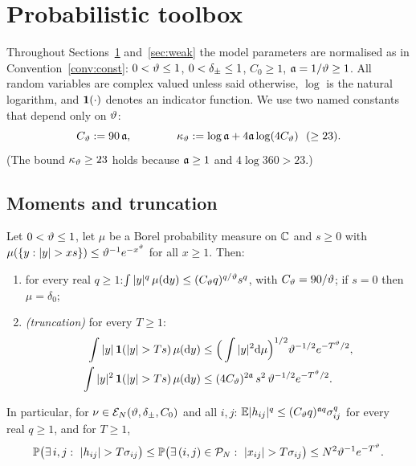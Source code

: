 \section{Probabilistic toolbox}\label{sec:prob}
Throughout Sections~\ref{sec:prob} and~\ref{sec:weak} the model parameters are normalised as in Convention~\ref{conv:const}: $0<\vartheta\le1$, $0<\delta_\pm\le1$, $C_0\ge1$, $\mathfrak{a}=1/\vartheta\ge1$.
All random variables are complex valued unless said otherwise, $\log$ is the natural logarithm, and $\mathbf{1}(\cdot)$ denotes an indicator function.
We use two named constants that depend only on $\vartheta$:
\[
 C_\vth:=90\,\fa,\qquad\qquad\kappa_\vth:=\log\fa+4\fa\log(4C_\vth)\ \ (\ge23).
\]
(The bound $\kappa_\vartheta\ge23$ holds because $\mathfrak{a}\ge1$ and $4\log360>23$.)
\subsection{Moments and truncation}
\begin{lemma}[Moments]\label{lem:moments}
Let $0<\vartheta\le1$, let $\mu$ be a Borel probability measure on $\mathbb{C}$ and $s\ge0$ with $\mu(\{y:|y|>xs\})\le\vth^{-1}e^{-x^\vth}$ for all $x\ge1$. Then:
\begin{enumerate}[label=\textup{(\alph*)},leftmargin=2.2em,itemsep=1pt]
\item for every real $q\ge1$:\quad $\int|y|^q\,\mu(\mathrm{d} y)\le(C_\vartheta q)^{q/\vartheta}s^q$, with $C_\vartheta=90/\vartheta$; if $s=0$ then $\mu=\delta_0$;
\item \emph{(truncation)} for every $T\ge1$:
\begin{align*}
 \int|y|\,\bone(|y|>Ts)\,\mu(\rd y)&\le\Big(\int|y|^2\rd\mu\Big)^{1/2}\vth^{-1/2}e^{-T^\vth/2},\\
 \int|y|^2\,\bone(|y|>Ts)\,\mu(\rd y)&\le(4C_\vth)^{2\fa}\,s^2\,\vth^{-1/2}e^{-T^\vth/2}.
\end{align*}
\end{enumerate}
In particular, for $\nu\in\mathcal E_N(\vartheta,\delta_\pm,C_0)$ and all $i,j$: $\mathbb{E}|h_{ij}|^q\le(C_\vartheta q)^{\mathfrak{a} q}\sigma_{ij}^q$ for every real $q\ge1$, and for $T\ge1$,
\[
 \PP\big(\exists\,i,j:\ |h_{ij}|>T\sigma_{ij}\big)\le\PP\big(\exists\,(i,j)\in\mathcal P_N:\ |x_{ij}|>T\sigma_{ij}\big)\le N^2\vth^{-1}e^{-T^\vth}.
\]
\end{lemma}
